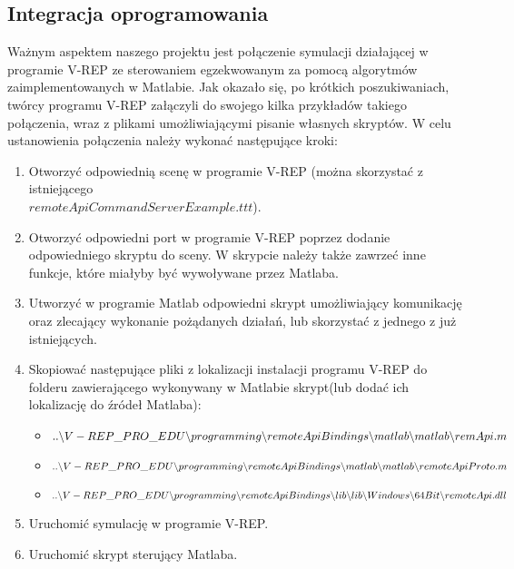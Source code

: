 \documentclass[11pt, a4paper, twoside]{article}
\begin{document}
\subsection{Integracja oprogramowania}
\label{subsec:integracja}
Ważnym aspektem naszego projektu jest połączenie symulacji działającej w programie V-REP ze sterowaniem egzekwowanym za pomocą algorytmów zaimplementowanych w Matlabie. Jak okazało się, po krótkich poszukiwaniach, twórcy programu V-REP załączyli do swojego kilka przykładów takiego połączenia, wraz z plikami umożliwiającymi pisanie własnych skryptów. W celu ustanowienia połączenia należy wykonać następujące kroki:
\begin{enumerate}[1)]
	\item Otworzyć odpowiednią scenę w programie V-REP (można skorzystać z istniejącego\\ $remoteApiCommandServerExample.ttt$).
	\item Otworzyć odpowiedni port w programie V-REP poprzez dodanie odpowiedniego skryptu do sceny. W skrypcie należy także zawrzeć inne funkcje, które miałyby być wywoływane przez Matlaba.
	\item Utworzyć w programie Matlab odpowiedni skrypt umożliwiający komunikację oraz zlecający wykonanie pożądanych działań, lub skorzystać z jednego z już istniejących.
	\item Skopiować następujące pliki z lokalizacji instalacji programu V-REP do folderu zawierającego wykonywany w Matlabie skrypt(lub dodać ich lokalizację do źródeł Matlaba):
	\begin{itemize}
		\item $..\backslash V-REP\_PRO\_EDU\backslash programming\backslash remoteApiBindings\backslash \\matlab\backslash matlab\backslash remApi.m$
		\item $..\backslash V-REP\_PRO\_EDU\backslash programming\backslash remoteApiBindings\backslash \\matlab\backslash matlab\backslash remoteApiProto.m$
		\item $..\backslash V-REP\_PRO\_EDU\backslash programming\backslash remoteApiBindings\backslash \\lib\backslash lib\backslash Windows\backslash 64Bit\backslash remoteApi.dll$
	\end{itemize}
	\item Uruchomić symulację w programie V-REP.
	\item Uruchomić skrypt sterujący Matlaba.
\end{enumerate}
\end{document}
